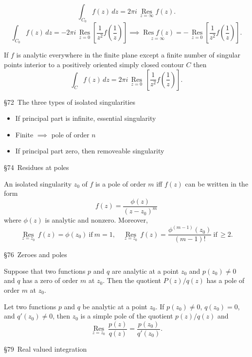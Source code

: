 \[
    \int_{C_0}^{} f(z) \, dz=2\pi i\, \underset{z=\infty}{\operatorname{R es}} f(z).
\] 
\[
    \int_{C_0}^{} f(z) \, dz=-2\pi i \,\underset{z=0}{\operatorname{R es}} \left[ \frac{1}{z^2}f\left( \frac{1}{z} \right)  \right] \implies \underset{z=\infty}{\operatorname{R es}f(z)} =- \, \underset{z=0}{\operatorname{R es}} \left[ \frac{1}{z^2}f\left( \frac{1}{z} \right)  \right] .
\] 
\begin{theorem}
    If $f$ is analytic everywhere in the finite plane except a finite number of singular points interior to a positively oriented simply closed contour $C$ then     
\[
    \int_{C}^{} f(z) \, dz=2\pi i\, \underset{z=0}{\operatorname{R es}}\, \left[ \frac{1}{z^2}f\left( \frac{1}{z} \right)  \right]  .
\] 
\end{theorem}
\noindent\Large{\S 72}\normalsize \ 
The three types of isolated singularities
\begin{itemize}
    \item If principal part is infinite, essential singularity
    \item Finite $\implies $ pole of order $n$
    \item If principal part zero, then removeable singularity
\end{itemize}
\noindent\Large{\S 74}\normalsize \ 
Residues at poles
\begin{theorem}
    An isolated singularity $z_0$ of $f$ is a pole of order $m$ iff $f(z)$ can be written in the form \[
        f(z)=\frac{\phi(z)}{(z-z_0)^m}
    \] where $\phi(z)$ is analytic and nonzero. Moreover, \[
    \underset{z=z_0}{\operatorname{R es}}  \, f(z)=\phi(z_0) \ \text{if} \ m=1,\quad \underset{z=z_0}{\operatorname{R es}} \,f(z)= \frac{\phi^{(m-1)}(z_0)}{(m-1)!}\ \text{if} \,\geq 2.
    \] 
\end{theorem}
\noindent\Large{\S 76}\normalsize \ 
Zeroes and poles
\begin{theorem}
    Suppose that two functions $p$ and $q$ are analytic at a point $z_0$ and $p(z_0)\neq 0$ and $q$ has a zero of order $m$ at $z_{0}$. Then the quotient $P(z)/q(z)$ has a pole of order $m$ at $z_0$.
\end{theorem}
\begin{theorem}
    Let two functions $p$ and $q$ be analytic at a point $z_0$. If $p(z_0)\neq 0$, $q(z_0)=0$, and $q'(z_0)\neq 0$, then $z_0$ is a simple pole of the quotient $p(z)/q(z)$ and \[
        \underset{z=z_0}{\operatorname{R es}} \, \frac{p(z)}{q(z)}=\frac{p(z_0)}{q'(z_0)}.
    \] 
\end{theorem}
\noindent\Large{\S 79}\normalsize \ 
Real valued integration
